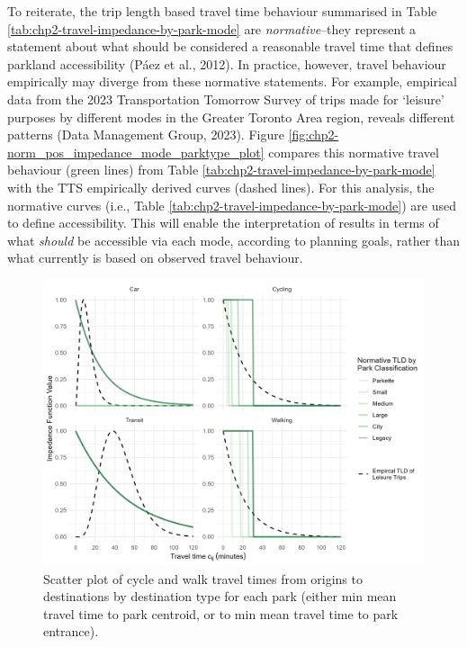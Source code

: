 \documentclass[
11pt, %
oneside, %
english, %
singlespacing, %
]{macthesis} %
\begin{document}
To reiterate, the trip length based travel time behaviour summarised in Table \ref{tab:chp2-travel-impedance-by-park-mode} are \emph{normative}--they represent a statement about what should be considered a reasonable travel time that defines parkland accessibility (Páez et al., 2012). In practice, however, travel behaviour empirically may diverge from these normative statements. For example, empirical data from the 2023 Transportation Tomorrow Survey of trips made for `leisure' purposes by different modes in the Greater Toronto Area region, reveals different patterns (Data Management Group, 2023). Figure \ref{fig:chp2-norm_pos_impedance_mode_parktype_plot} compares this normative travel behaviour (green lines) from Table \ref{tab:chp2-travel-impedance-by-park-mode} with the TTS empirically derived curves (dashed lines). For this analysis, the normative curves (i.e., Table \ref{tab:chp2-travel-impedance-by-park-mode}) are used to define accessibility. This will enable the interpretation of results in terms of what \emph{should} be accessible via each mode, according to planning goals, rather than what currently is based on observed travel behaviour.

\begin{figure}

{\centering \includegraphics[width=6in]{./data/figures/chp2-norm_pos_impedance_mode_parktype_plot} 

}

\caption{\label{fig:chp2-norm_pos_impedance_mode_parktype_plot}  Scatter plot of cycle and walk travel times from origins to destinations by destination type for each park (either min mean travel time to park centroid, or to min mean travel time to park entrance). }\label{fig:unnamed-chunk-13}
\end{figure}
\end{document}
